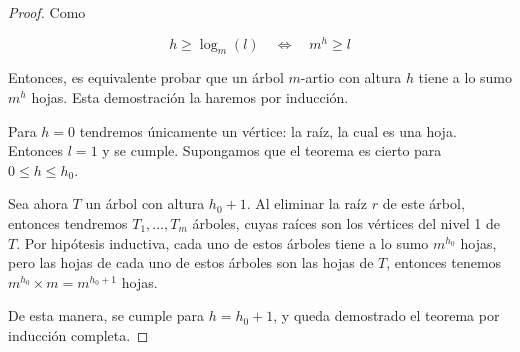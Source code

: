 \begin{proof}
    Como
    
    \[
    h \geq \log_m (l) \quad \iff \quad m^h \geq l
    \]
    
    Entonces, es equivalente probar que un árbol $m$-artio con altura $h$ tiene a lo sumo $m^h$ hojas. Esta demostración la haremos por inducción.
    
    Para $h = 0$ tendremos únicamente un vértice: la raíz, la cual es una hoja. Entonces $l = 1$ y se cumple. Supongamos que el teorema es cierto para $0 \leq h \leq h_0$.
    
    Sea ahora $T$ un árbol con altura $h_0 + 1$. Al eliminar la raíz $r$ de este árbol, entonces tendremos $T_1, \dots, T_m$ árboles, cuyas raíces son los vértices del nivel 1 de $T$. Por hipótesis inductiva, cada uno de estos árboles tiene a lo sumo $m^{h_0}$ hojas, pero las hojas de cada uno de estos árboles son las hojas de $T$, entonces tenemos $m^{h_0} \times m = m^{h_0+1}$ hojas.
    
    De esta manera, se cumple para $h = h_0 + 1$, y queda demostrado el teorema por inducción completa.
\end{proof}

